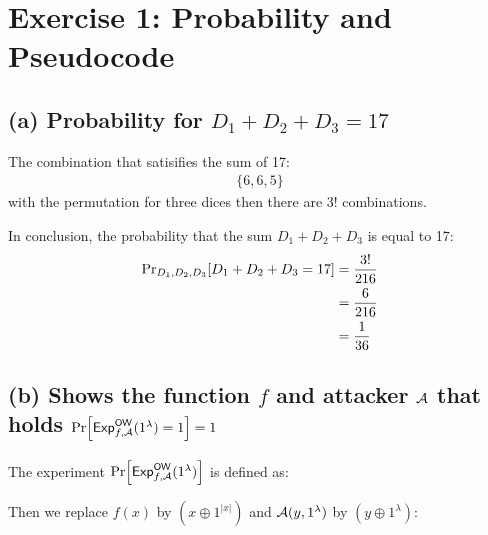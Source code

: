 \section{Exercise 1: Probability and Pseudocode}

\subsection*{(a) Probability for \(D_1 + D_2 + D_3 = 17 \)}
The combination that satisifies the sum of 17:
\begin{align*}
    \{6, 6, 5\}
\end{align*}
with the permutation for three dices then there are \(3!\) combinations.

In conclusion, the probability that the sum \(D_1 + D_2 + D_3 \) is equal
to 17:
\begin{align*}
    \probsub{D_1,D_2,D_3}{D_1+D_2+D_3=17} &= \frac{3!}{216} \\
    &= \frac{6}{216} \\
    &= \frac{1}{36}
\end{align*}


\subsection*{(b) Shows the function \(f\) and attacker \(\mathcal{A}\) that holds
            \(\prob{\mathsf{Exp}_{f, \adv}^{\mathsf{OW}}(1^\lambda) = 1} = 1\)}

The experiment \(\prob{\mathsf{Exp}_{f, \adv}^{\mathsf{OW}}(1^\lambda)}\) is defined as:
\begin{center}
\end{center}

Then we replace \(f(x)\) by \(\left(x \oplus 1^{\lvert x \rvert}\right)\) and
\(\mathcal{A}(y, 1^{\lambda})\) by \(\left(y \oplus 1^{\lambda}\right)\):
\begin{center}
\end{center}

